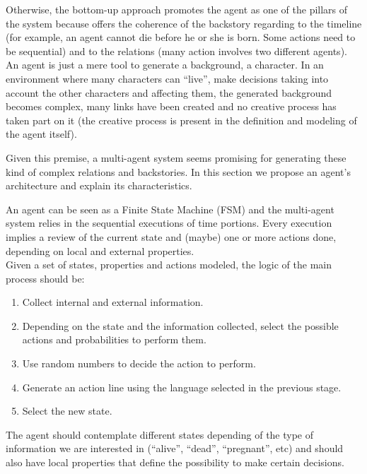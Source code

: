 \documentclass{sig-alternate}
\begin{document}
Otherwise, the bottom-up approach promotes the agent as one of the pillars of the system because offers the coherence of the backstory regarding to the timeline (for example, an agent cannot die before he or she is born. Some actions need to be sequential) and to the relations (many action involves two different agents). An agent is just a mere tool to generate a background, a character. In an environment where many characters can ``live'', make decisions taking into account the other characters and affecting them, the generated background becomes complex, many links have been created and no creative process has taken part on it (the creative process is present in the definition and modeling of the agent itself).

Given this premise, a multi-agent system seems promising for generating these kind of complex relations and backstories. In this section we propose an agent's architecture and explain its characteristics.



An agent can be seen as a Finite State Machine (FSM) and the multi-agent system relies in the sequential executions of time portions. Every execution implies a review of the current state and (maybe) one or more actions done, depending on local and external properties.\\

Given a set of states, properties and actions modeled, the logic of the main process should be:

\begin{enumerate}
\item Collect internal and external information.
\item Depending on the state and the information collected, select the possible actions and probabilities to perform them.
\item Use random numbers to decide the action to perform.
\item Generate an action line using the language selected in the previous stage.
\item Select the new state.
\end{enumerate}


The agent should contemplate different states depending of the type of information we are interested in (``alive'', ``dead'', ``pregnant'', etc) and should also have local properties that define the possibility to make certain decisions.
\end{document}
